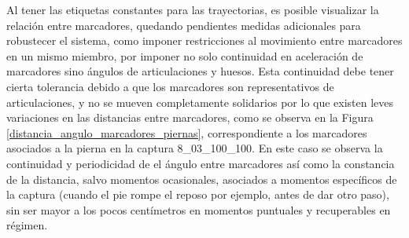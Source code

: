 Al tener las etiquetas constantes para las trayectorias, es posible visualizar la relación entre marcadores, quedando pendientes medidas adicionales para robustecer el sistema, como imponer restricciones al movimiento entre marcadores en un mismo miembro, por imponer no solo continuidad en aceleración de marcadores sino ángulos de articulaciones y huesos. Esta continuidad debe tener cierta tolerancia debido a que los marcadores son representativos de articulaciones, y no se mueven completamente solidarios por lo que existen leves variaciones en las distancias entre marcadores, como se observa en la Figura \ref{distancia_angulo_marcadores_piernas}, correspondiente a los marcadores asociados a la pierna en la captura 8\_03\_100\_100. En este caso se observa la continuidad y periodicidad de el ángulo entre marcadores así como la constancia de la distancia, salvo momentos ocasionales, asociados a momentos específicos de la captura (cuando el pie rompe el reposo por ejemplo, antes de dar otro paso), sin ser mayor a los pocos centímetros en momentos puntuales y recuperables en régimen.

